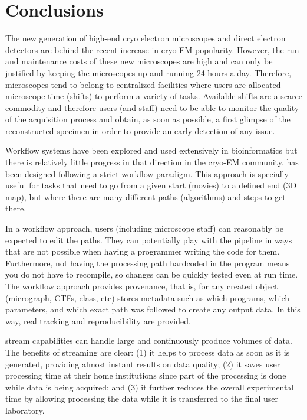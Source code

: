 
\section{Conclusions}

The new generation of high-end cryo electron microscopes and direct electron detectors are behind the recent increase in cryo-EM  popularity. However, the run and maintenance costs of these new microscopes are high and can only be justified by keeping the microscopes up and running 24 hours a day. Therefore, microscopes tend to belong to centralized facilities where users are allocated microscope time (shifts) to perform a variety of tasks. Available shifts are a scarce commodity and therefore users (and staff) need to be able to monitor the quality of the acquisition process and obtain, as soon as possible, a first glimpse of the reconstructed specimen in order to provide an early detection of any issue. 

 Workflow systems have been explored and used extensively in bioinformatics but there is relatively little progress in that direction in the cryo-EM community. \scipion has been designed following a strict workflow paradigm. This approach is specially useful for tasks that need to go from a given start (movies) to a defined end (3D map), but where there are many different paths (algorithms) and steps to get there.
 
 In a workflow approach, users (including microscope staff) can reasonably be expected to edit the paths. They can potentially play with the pipeline in ways that are not possible when having a programmer writing the code for them. Furthermore, not having the processing path hardcoded in the program means you do not have to recompile, so changes can be quickly tested   even at run time. The \scipion workflow approach provides provenance, that is,  for any created object (micrograph, CTFs, class, etc) \scipion stores metadata such as which programs, which parameters, and which exact path was followed to create any output data.  In this way,  real tracking and reproducibility are provided. 

 \scipion stream capabilities can handle large and continuously produce volumes of data. The benefits of streaming are clear: (1) it helps to process data as soon as it is generated,  providing almost instant results on data quality; (2) it saves user processing time at their home institutions since part of the processing is done while data is being acquired; and (3) 
 it further reduces the overall experimental time by allowing processing the data while it is transferred to the final user laboratory. 
 
